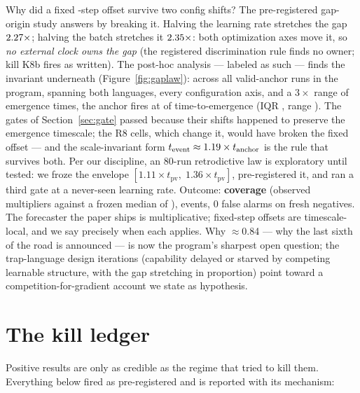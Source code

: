 \documentclass[11pt]{article}
\newcommand{\tev}{t_{\mathrm{event}}}
\newcommand{\tpv}{t_{\mathrm{pv}}}
\begin{document}
Why did a fixed \wConfDelta-step offset survive two config shifts? The pre-registered gap-origin
study answers by breaking it. Halving the learning rate stretches the gap
$2.27\times$; halving the batch stretches it $2.35\times$: both
optimization axes move it, so \emph{no external clock owns the gap} (the registered
discrimination rule finds no owner; kill K8b fires as written). The post-hoc analysis
--- labeled as such --- finds the invariant underneath (Figure~\ref{fig:gaplaw}): across
all \wLawN{} valid-anchor runs in the program, spanning both languages, every
configuration axis, and a $3\times$ range of emergence times, the anchor fires at
\wLawFrac{} of time-to-emergence (IQR \wLawIQR, range \wLawRange). The gates of
Section~\ref{sec:gate} passed because their shifts happened to preserve the emergence
timescale; the R8 cells, which change it, would have broken the fixed offset --- and the
scale-invariant form $\tev \approx \wLawMult \times t_{\mathrm{anchor}}$ is the rule
that survives both. Per our discipline, an 80-run retrodictive law is exploratory until
tested: we froze the envelope $[1.11 \times \tpv,\; 1.36 \times \tpv]$, pre-registered
it, and ran a third gate at a never-seen learning rate. Outcome: \textbf{\wNineCover{}
coverage} (observed multipliers \wNineMultRange{} against a frozen median of \wLawMult),
\wNineEvents{} events, 0 false alarms on fresh negatives. The forecaster the paper ships
is multiplicative; fixed-step offsets are timescale-local, and we say precisely when
each applies. Why $\approx$0.84 --- why the last sixth of the road is announced --- is
now the program's sharpest open question; the trap-language design iterations
(capability delayed or starved by competing learnable structure, with the gap stretching
in proportion) point toward a competition-for-gradient account we state as hypothesis.

\section{The kill ledger}
\label{sec:kills}

Positive results are only as credible as the regime that tried to kill them. Everything
below fired as pre-registered and is reported with its mechanism:
\end{document}
